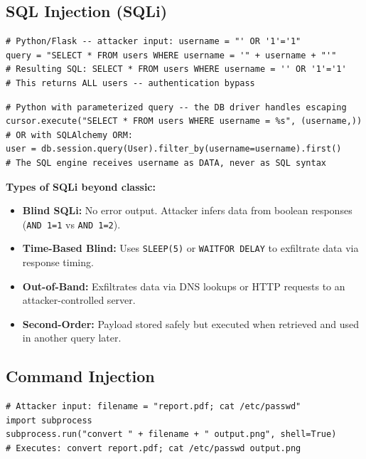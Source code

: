 \documentclass[11pt, letterpaper]{article}
\begin{document}
\subsection*{SQL Injection (SQLi)}

\begin{lstlisting}[style=vuln, caption={VULNERABLE: string concatenation -- never do this}]
# Python/Flask -- attacker input: username = "' OR '1'='1"
query = "SELECT * FROM users WHERE username = '" + username + "'"
# Resulting SQL: SELECT * FROM users WHERE username = '' OR '1'='1'
# This returns ALL users -- authentication bypass
\end{lstlisting}

\begin{lstlisting}[style=safe, caption={SECURE: parameterized queries separate code from data}]
# Python with parameterized query -- the DB driver handles escaping
cursor.execute("SELECT * FROM users WHERE username = %s", (username,))
# OR with SQLAlchemy ORM:
user = db.session.query(User).filter_by(username=username).first()
# The SQL engine receives username as DATA, never as SQL syntax
\end{lstlisting}

\begin{tcolorbox}[colback=part6bg, colframe=sectionred, arc=3pt, boxrule=1pt]
\textbf{Types of SQLi beyond classic:}
\begin{itemize}[noitemsep, leftmargin=*]
  \item \textbf{Blind SQLi:} No error output. Attacker infers data from boolean responses (\texttt{AND 1=1} vs \texttt{AND 1=2}).
  \item \textbf{Time-Based Blind:} Uses \texttt{SLEEP(5)} or \texttt{WAITFOR DELAY} to exfiltrate data via response timing.
  \item \textbf{Out-of-Band:} Exfiltrates data via DNS lookups or HTTP requests to an attacker-controlled server.
  \item \textbf{Second-Order:} Payload stored safely but executed when retrieved and used in another query later.
\end{itemize}
\end{tcolorbox}

\subsection*{Command Injection}

\begin{lstlisting}[style=vuln, caption={VULNERABLE: shell=True passes input directly to the shell}]
# Attacker input: filename = "report.pdf; cat /etc/passwd"
import subprocess
subprocess.run("convert " + filename + " output.png", shell=True)
# Executes: convert report.pdf; cat /etc/passwd output.png
\end{lstlisting}
\end{document}
